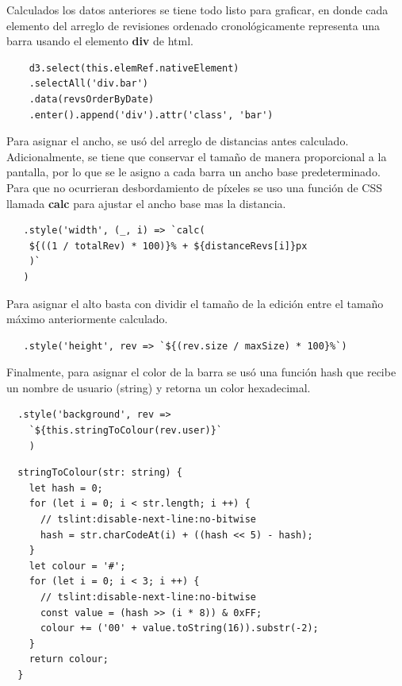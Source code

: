 \begin{enumerate}
  Calculados los datos anteriores se tiene todo listo para graficar, en donde cada elemento del arreglo de revisiones ordenado cronológicamente representa una barra usando el elemento \textbf{div} de html.
  
  \begin{verbatim}
    d3.select(this.elemRef.nativeElement)
    .selectAll('div.bar')
    .data(revsOrderByDate)
    .enter().append('div').attr('class', 'bar')
  \end{verbatim} 
  
  Para asignar el ancho, se usó del arreglo de distancias antes calculado. Adicionalmente, se tiene que conservar el tamaño de manera proporcional a la pantalla, por lo que se le asigno a cada barra un ancho base predeterminado. Para que no ocurrieran desbordamiento de píxeles se uso una función de CSS llamada \textbf{calc} para ajustar el ancho base mas la distancia.
  
  \begin{verbatim}
   .style('width', (_, i) => `calc(
    ${((1 / totalRev) * 100)}% + ${distanceRevs[i]}px
    )`
   )
  \end{verbatim} 
  
  Para asignar el alto basta con dividir el tamaño de la edición entre el tamaño máximo anteriormente calculado.
  
  \begin{verbatim}
   .style('height', rev => `${(rev.size / maxSize) * 100}%`)
  \end{verbatim} 
  
  Finalmente, para asignar el color de la barra se usó una función hash que recibe un nombre de usuario (string) y retorna un color hexadecimal.
 
  \begin{verbatim}
  .style('background', rev => 
    `${this.stringToColour(rev.user)}`
    )
  \end{verbatim}
  
  \begin{verbatim}
  stringToColour(str: string) {
    let hash = 0;
    for (let i = 0; i < str.length; i ++) {
      // tslint:disable-next-line:no-bitwise
      hash = str.charCodeAt(i) + ((hash << 5) - hash);
    }
    let colour = '#';
    for (let i = 0; i < 3; i ++) {
      // tslint:disable-next-line:no-bitwise
      const value = (hash >> (i * 8)) & 0xFF;
      colour += ('00' + value.toString(16)).substr(-2);
    }
    return colour;
  }
  \end{verbatim} 
  

\end{enumerate}
